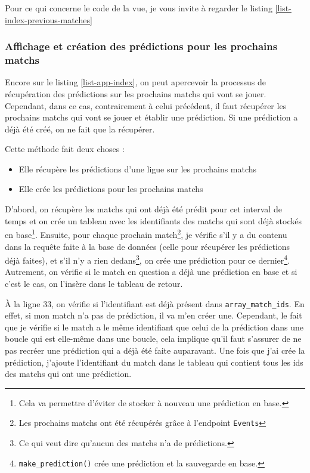 \documentclass[a4paper,14pt]{extarticle}
\begin{document}
{Pour ce qui concerne le code de la vue, je vous invite à regarder le listing \ref{list-index-previous-matches}


\subsubsection{Affichage et création des prédictions pour les prochains matchs}

Encore sur le listing \ref{list-app-index}, on peut apercevoir la processus de récupération des prédictions sur les prochains matchs qui vont se jouer. Cependant, dans ce cas, contrairement à celui précédent, il faut récupérer les prochains matchs qui vont se jouer et établir une prédiction. Si une prédiction a déjà été créé, on ne fait que la récupérer.


Cette méthode fait deux choses :
\begin{itemize}
    \item Elle récupère les prédictions d'une ligue sur les prochains matchs
    \item Elle crée les prédictions pour les prochains matchs
\end{itemize}

D'abord, on récupère les matchs qui ont déjà été prédit pour cet interval de temps et on crée un tableau avec les identifiants des matchs qui sont déjà stockés en base\footnote{Cela va permettre d'éviter de stocker à nouveau une prédiction en base.}. Ensuite, pour chaque prochain match\footnote{Les prochains matchs ont été récupérés grâce à l'endpoint \texttt{Events}}, je vérifie s'il y a du contenu dans la requête faite à la base de données (celle pour récupérer les prédictions déjà faites), et s'il n'y a rien dedans\footnote{Ce qui veut dire qu'aucun des matchs n'a de prédictions.}, on crée une prédiction pour ce dernier\footnote{\texttt{make\_prediction()} crée une prédiction et la sauvegarde en base.}. Autrement, on vérifie si le match en question a déjà une prédiction en base et si c'est le cas, on l'insère dans le tableau de retour.

À la ligne 33, on vérifie si l'identifiant est déjà présent dans \texttt{array\_match\_ids}. En effet, si mon match n'a pas de prédiction, il va m'en créer une. Cependant, le fait que je vérifie si le match a le même identifiant que celui de la prédiction dans une boucle qui est elle-même dans une boucle, cela implique qu'il faut s'assurer de ne pas recréer une prédiction qui a déjà été faite auparavant. Une fois que j'ai crée la prédiction, j'ajoute l'identifiant du match dans le tableau qui contient tous les ids des matchs qui ont une prédiction.

}
\end{document}
